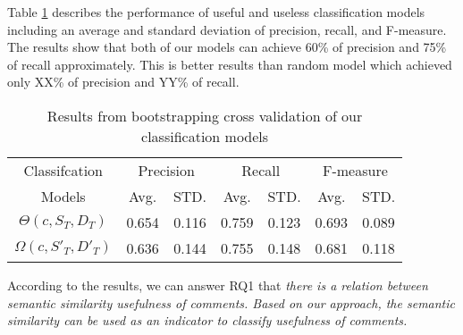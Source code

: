 Table \ref{tb:xvalidate} describes the performance of useful and useless classification models including an average and standard deviation of precision, recall, and F-measure. The results show that both of our models can achieve  60\% of precision and  75\% of recall approximately. This is better results than random model which achieved only XX\% of precision and YY\% of recall. 



\begin{table}[!t]
\caption{Results from bootstrapping cross validation of our classification models}
\small
\centering
\def\arraystretch{1.2}
\begin{tabular}{ccc|cc|cc}
\hline
Classifcation & \multicolumn{2}{c|}{Precision} & \multicolumn{2}{c|}{Recall} & \multicolumn{2}{c}{F-measure} \\ \cline{2-7}
Models & Avg. & STD. & Avg. & STD. & Avg. & STD. \\ \hline \hline
$\Theta(c,S_T,D_T)$    &  0.654 & 0.116 &  0.759 & 0.123 & 0.693 & 0.089\\
$\Omega(c,S'_T,D'_T)$  &  0.636 & 0.144 &  0.755 & 0.148 & 0.681 & 0.118\\
\hline
\end{tabular}
\label{tb:xvalidate}
\end{table}

According to the results, we can answer RQ1 that \emph{there is a relation between semantic similarity usefulness of comments. Based on our approach, the semantic similarity can be used as an indicator to classify usefulness of comments. 
}


